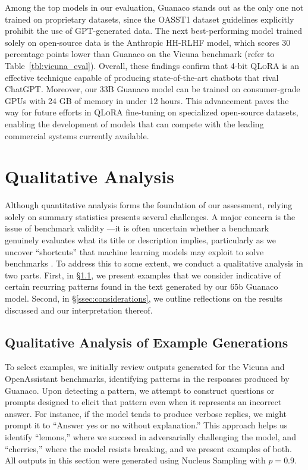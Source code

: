 Among the top models in our evaluation, {Guanaco} stands out as the only one not trained on proprietary datasets, since the OASST1 dataset guidelines explicitly prohibit the use of GPT-generated data. The next best-performing model trained solely on open-source data is the Anthropic HH-RLHF model, which scores 30 percentage points lower than {Guanaco} on the Vicuna benchmark (refer to Table~\ref{tbl:vicuna_eval}). Overall, these findings confirm that 4-bit \textsc{QLoRA} is an effective technique capable of producing state-of-the-art chatbots that rival ChatGPT. Moreover, our 33B {Guanaco} model can be trained on consumer-grade GPUs with 24 GB of memory in under 12 hours. This advancement paves the way for future efforts in \textsc{QLoRA} fine-tuning on specialized open-source datasets, enabling the development of models that can compete with the leading commercial systems currently available.

\section{Qualitative Analysis}

Although quantitative analysis forms the foundation of our assessment, relying solely on summary statistics presents several challenges. A major concern is the issue of benchmark validity \citep{liao2021we}—it is often uncertain whether a benchmark genuinely evaluates what its title or description implies, particularly as we uncover ``shortcuts'' that machine learning models may exploit to solve benchmarks \citep{gururangan2018annotation, poliak2018hypothesis}. To address this to some extent, we conduct a qualitative analysis in two parts. First, in \S\ref{ssec:examples}, we present examples that we consider indicative of certain recurring patterns found in the text generated by our 65b {Guanaco} model. Second, in \S\ref{ssec:considerations}, we outline reflections on the results discussed and our interpretation thereof.

\subsection{Qualitative Analysis of Example Generations}
\label{ssec:examples}

To select examples, we initially review outputs generated for the Vicuna and OpenAssistant benchmarks, identifying patterns in the responses produced by {Guanaco}. Upon detecting a pattern, we attempt to construct questions or prompts designed to elicit that pattern even when it represents an incorrect answer. For instance, if the model tends to produce verbose replies, we might prompt it to ``Answer yes or no without explanation.'' This approach helps us identify ``lemons,'' where we succeed in adversarially challenging the model, and ``cherries,'' where the model resists breaking, and we present examples of both. All outputs in this section were generated using Nucleus Sampling \cite{holtzmancurious} with $p=0.9$.

